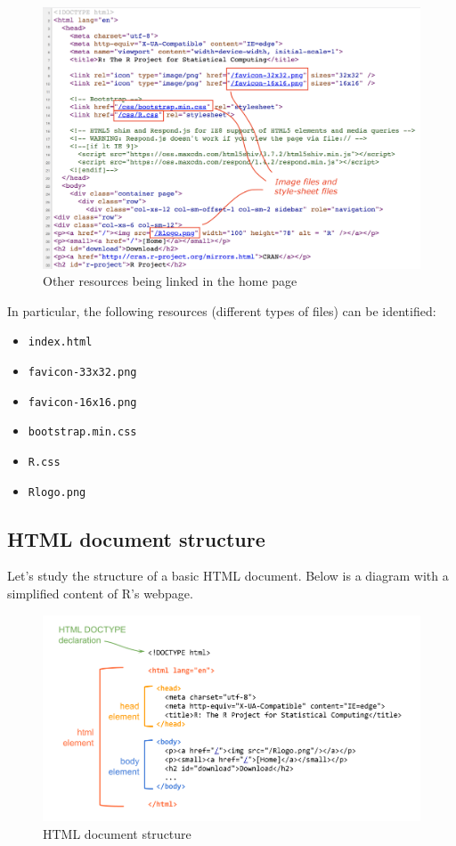 \documentclass[
]{book}
\providecommand{\tightlist}{%
  \setlength{\itemsep}{0pt}\setlength{\parskip}{0pt}}
\begin{document}
\begin{figure}

{\centering \includegraphics[width=0.7\linewidth]{images/html/r-webpage-source2} 

}

\caption{Other resources being linked in the home page}\label{fig:unnamed-chunk-76}
\end{figure}

In particular, the following resources (different types of files) can be
identified:

\begin{itemize}
\tightlist
\item
  \texttt{index.html}
\item
  \texttt{favicon-33x32.png}
\item
  \texttt{favicon-16x16.png}
\item
  \texttt{bootstrap.min.css}
\item
  \texttt{R.css}
\item
  \texttt{Rlogo.png}
\end{itemize}

\hypertarget{html-document-structure}{%
\subsection{HTML document structure}\label{html-document-structure}}

Let's study the structure of a basic HTML document. Below is a diagram with a
simplified content of R's webpage.

\begin{figure}

{\centering \includegraphics[width=0.8\linewidth]{images/html/r-webpage-source3} 

}

\caption{HTML document structure}\label{fig:unnamed-chunk-77}
\end{figure}
\end{document}
